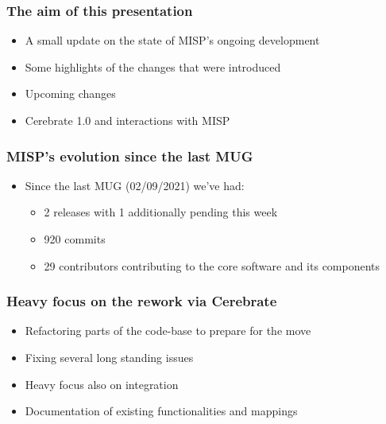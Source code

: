
\begin{frame}
\titlepage
\end{frame}

\begin{frame}
  \frametitle{The aim of this presentation}
  \begin{itemize}
     \item A small update on the state of MISP's ongoing development
     \item Some highlights of the changes that were introduced
     \item Upcoming changes
     \item Cerebrate 1.0 and interactions with MISP
  \end{itemize}
\end{frame}

\begin{frame}
  \frametitle{MISP's evolution since the last MUG}
  \begin{itemize}
    \item Since the last MUG (02/09/2021) we've had:
    \begin{itemize}
        \item 2 releases with 1 additionally pending this week
        \item 920 commits
        \item 29 contributors contributing to the core software and its components
    \end{itemize}
  \end{itemize}
\end{frame}

\begin{frame}
  \frametitle{Heavy focus on the rework via Cerebrate}
  \begin{itemize}
      \item Refactoring parts of the code-base to prepare for the move
      \item Fixing several long standing issues
      \item Heavy focus also on integration
      \item Documentation of existing functionalities and mappings
  \end{itemize}
\end{frame}

